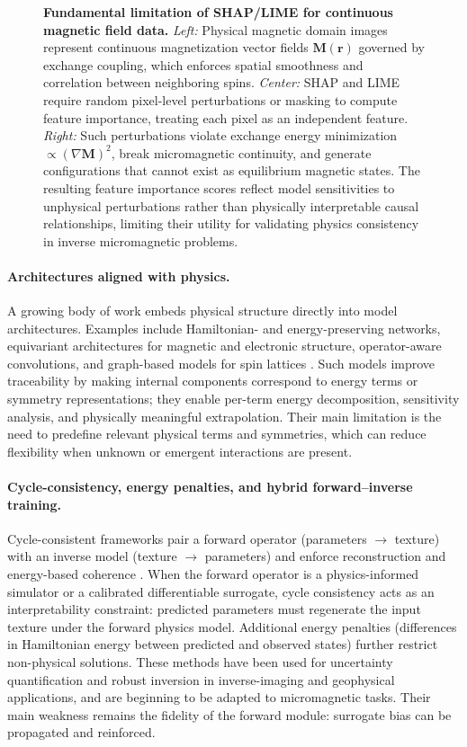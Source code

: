 \documentclass[letterpaper, 12, one column]{article}
\begin{document}
\begin{figure}[H]
\begin{tikzpicture}[scale=0.65, every node/.style={font=\small}, transform shape]
\end{tikzpicture}
\caption{\textbf{Fundamental limitation of SHAP/LIME for continuous magnetic field data.} \textit{Left:} Physical magnetic domain images represent continuous magnetization vector fields $\mathbf{M}(\mathbf{r})$ governed by exchange coupling, which enforces spatial smoothness and correlation between neighboring spins. \textit{Center:} SHAP and LIME require random pixel-level perturbations or masking to compute feature importance, treating each pixel as an independent feature. \textit{Right:} Such perturbations violate exchange energy minimization $\propto (\nabla \mathbf{M})^2$, break micromagnetic continuity, and generate configurations that cannot exist as equilibrium magnetic states. The resulting feature importance scores reflect model sensitivities to unphysical perturbations rather than physically interpretable causal relationships, limiting their utility for validating physics consistency in inverse micromagnetic problems.}
\label{fig:shap_lime_limitations}
\end{figure}

\paragraph{Architectures aligned with physics.}
A growing body of work embeds physical structure directly into model architectures. Examples include Hamiltonian- and energy-preserving networks, equivariant architectures for magnetic and electronic structure, operator-aware convolutions, and graph-based models for spin lattices \cite{Dornheim2023Neural}. Such models improve traceability by making internal components correspond to energy terms or symmetry representations; they enable per-term energy decomposition, sensitivity analysis, and physically meaningful extrapolation. Their main limitation is the need to predefine relevant physical terms and symmetries, which can reduce flexibility when unknown or emergent interactions are present.

\paragraph{Cycle-consistency, energy penalties, and hybrid forward--inverse training.}
Cycle-consistent frameworks pair a forward operator (parameters $\rightarrow$ texture) with an inverse model (texture $\rightarrow$ parameters) and enforce reconstruction and energy-based coherence \cite{Huang2023}. When the forward operator is a physics-informed simulator or a calibrated differentiable surrogate, cycle consistency acts as an interpretability constraint: predicted parameters must regenerate the input texture under the forward physics model. Additional energy penalties (differences in Hamiltonian energy between predicted and observed states) further restrict non-physical solutions. These methods have been used for uncertainty quantification and robust inversion in inverse-imaging and geophysical applications, and are beginning to be adapted to micromagnetic tasks. Their main weakness remains the fidelity of the forward module: surrogate bias can be propagated and reinforced.
\end{document}
